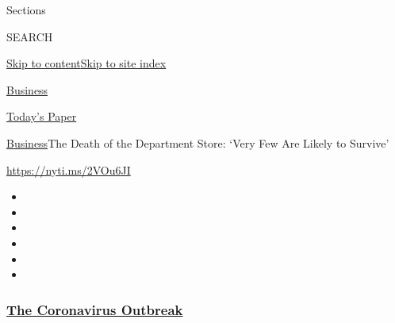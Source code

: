 Sections

SEARCH

\protect\hyperlink{site-content}{Skip to
content}\protect\hyperlink{site-index}{Skip to site index}

\href{https://www.nytimes3xbfgragh.onion/section/business}{Business}

\href{https://myaccount.nytimes3xbfgragh.onion/auth/login?response_type=cookie\&client_id=vi}{}

\href{https://www.nytimes3xbfgragh.onion/section/todayspaper}{Today's
Paper}

\href{/section/business}{Business}\textbar{}The Death of the Department
Store: `Very Few Are Likely to Survive'

\url{https://nyti.ms/2VOu6JI}

\begin{itemize}
\item
\item
\item
\item
\item
\item
\end{itemize}

\hypertarget{the-coronavirus-outbreak}{%
\subsubsection{\texorpdfstring{\href{https://www.nytimes3xbfgragh.onion/news-event/coronavirus?name=styln-coronavirus-markets\&region=TOP_BANNER\&block=storyline_menu_recirc\&action=click\&pgtype=Article\&impression_id=9c9471d0-f4ba-11ea-ac49-a90bab9687ed\&variant=undefined}{The
Coronavirus
Outbreak}}{The Coronavirus Outbreak}}\label{the-coronavirus-outbreak}}

